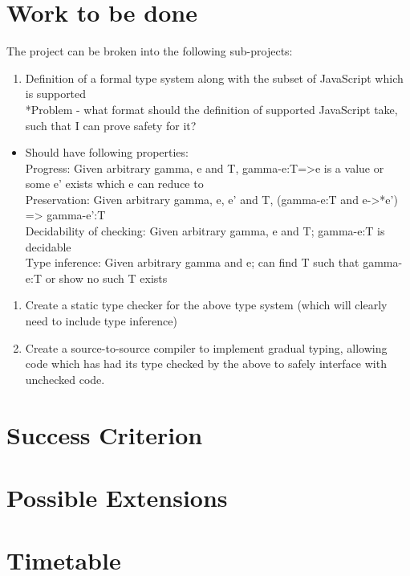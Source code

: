 \section{Work to be done}\label{work-to-be-done}

The project can be broken into the following sub-projects:

\begin{enumerate}
\itemsep1pt\parskip0pt
\item
  Definition of a formal type system along with the subset of JavaScript
  which is supported\\*Problem - what format should the definition of
  supported JavaScript take, such that I can prove safety for it?
\end{enumerate}

\begin{itemize}
\itemsep1pt\parskip0pt
\item
  Should have following properties:\\ Progress: Given arbitrary gamma, e
  and T, gamma\textbar{}-e:T=\textgreater{}e is a value or some e'
  exists which e can reduce to\\ Preservation: Given arbitrary gamma, e,
  e' and T, (gamma\textbar{}-e:T and e-\textgreater{}*e')
  =\textgreater{} gamma\textbar{}-e':T\\ Decidability of checking: Given
  arbitrary gamma, e and T; gamma\textbar{}-e:T is decidable\\ Type
  inference: Given arbitrary gamma and e; can find T such that
  gamma\textbar{}-e:T or show no such T exists
\end{itemize}

\begin{enumerate}
\itemsep1pt\parskip0pt
\item
  Create a static type checker for the above type system (which will
  clearly need to include type inference)
\item
  Create a source-to-source compiler to implement gradual typing,
  allowing code which has had its type checked by the above to safely
  interface with unchecked code.
\end{enumerate}

\section{Success Criterion}\label{success-criterion}

\section{Possible Extensions}\label{possible-extensions}

\section{Timetable}\label{timetable}






